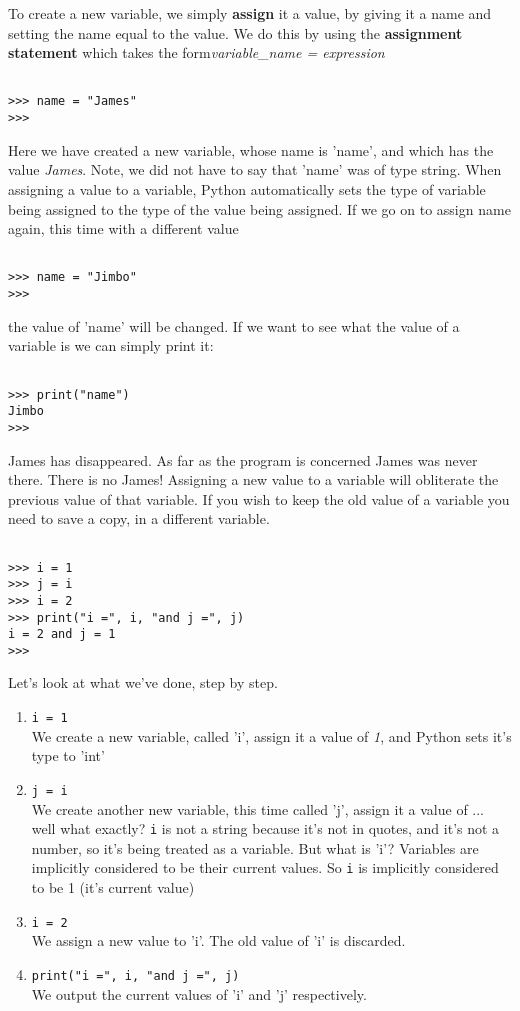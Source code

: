 To create a new variable, we simply \textbf{assign}   it a value, by giving it a name and setting the name equal to the   value. We do this by using the \textbf{assignment statement}   which takes the form\textit{variable\_name = expression}
\begin{lstlisting}

>>> name = "James"
>>>
\end{lstlisting}

Here we have created a new variable, whose name is 'name', and which   has the value \textit{James}. Note, we did not have to say that 'name' was of type string.   When assigning a value to a variable, Python automatically sets the type of   variable being assigned to the type of the value being assigned. If we   go on to assign name again, this time with a different value
\begin{lstlisting}

>>> name = "Jimbo"
>>>
\end{lstlisting}

the value of 'name' will be changed. If we want to see what the value of   a variable is we can simply print it:
\begin{lstlisting}

>>> print("name")
Jimbo
>>>
\end{lstlisting}

James has disappeared. As far as the program is concerned James was   never there. There is no James! Assigning a new value to a variable   will obliterate the previous value of that variable. If you wish to   keep the old value of a variable you need to save a copy, in a   different variable.
\begin{lstlisting}

>>> i = 1
>>> j = i
>>> i = 2
>>> print("i =", i, "and j =", j)
i = 2 and j = 1
>>>
\end{lstlisting}

Let's look at what we've done, step by step.
\begin{enumerate}
	\item 
\texttt{i = 1}
\\     We create a new variable, called 'i', assign it a value of    \textit{1}, and Python sets it's type to 'int'
	\item 
\texttt{j = i}
\\     We create another new variable, this time called 'j', assign it a    value of ... well what exactly? 
\texttt{i} is not a string    because it's not in quotes, and it's not a number, so it's being    treated as a variable. But what is 'i'? Variables are implicitly    considered to be their current values. So 
\texttt{i} is    implicitly considered to be 1 (it's current value)
	\item 
\texttt{i = 2}
\\     We assign a new value to 'i'. The old value of 'i' is    discarded.
	\item 
\texttt{print("i =", i, "and j =", j)}
\\     We output the current values of 'i' and 'j' respectively.
\end{enumerate}

